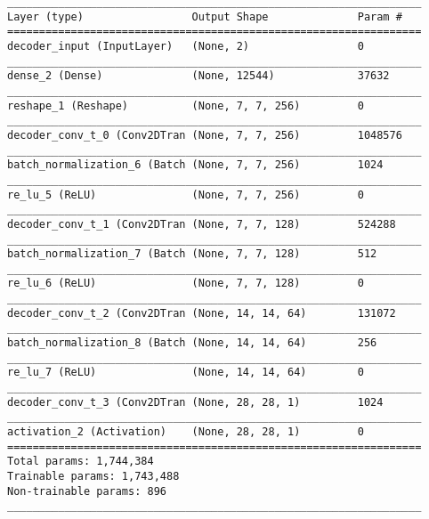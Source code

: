 \begin{lstlisting}[caption={\textsc{Mnist}-\ac{VAE}-\ac{GAN} Decoder},captionpos=b,basicstyle=\tiny, label={lst:mnist-vae-decoder}]
_________________________________________________________________
Layer (type)                 Output Shape              Param #
=================================================================
decoder_input (InputLayer)   (None, 2)                 0
_________________________________________________________________
dense_2 (Dense)              (None, 12544)             37632
_________________________________________________________________
reshape_1 (Reshape)          (None, 7, 7, 256)         0
_________________________________________________________________
decoder_conv_t_0 (Conv2DTran (None, 7, 7, 256)         1048576
_________________________________________________________________
batch_normalization_6 (Batch (None, 7, 7, 256)         1024
_________________________________________________________________
re_lu_5 (ReLU)               (None, 7, 7, 256)         0
_________________________________________________________________
decoder_conv_t_1 (Conv2DTran (None, 7, 7, 128)         524288
_________________________________________________________________
batch_normalization_7 (Batch (None, 7, 7, 128)         512
_________________________________________________________________
re_lu_6 (ReLU)               (None, 7, 7, 128)         0
_________________________________________________________________
decoder_conv_t_2 (Conv2DTran (None, 14, 14, 64)        131072
_________________________________________________________________
batch_normalization_8 (Batch (None, 14, 14, 64)        256
_________________________________________________________________
re_lu_7 (ReLU)               (None, 14, 14, 64)        0
_________________________________________________________________
decoder_conv_t_3 (Conv2DTran (None, 28, 28, 1)         1024
_________________________________________________________________
activation_2 (Activation)    (None, 28, 28, 1)         0
=================================================================
Total params: 1,744,384
Trainable params: 1,743,488
Non-trainable params: 896
_________________________________________________________________
\end{lstlisting}
